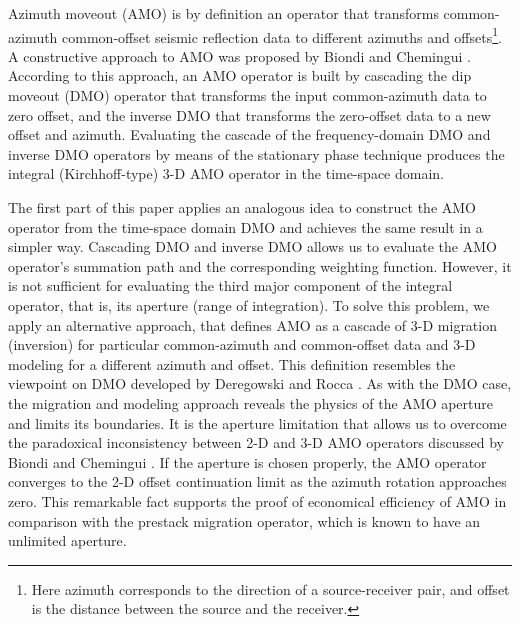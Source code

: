 Azimuth moveout (AMO) is by definition an operator that transforms
common-azimuth common-offset seismic reflection data to different
azimuths and offsets\footnote{Here azimuth corresponds to the
direction of a source-receiver pair, and offset is the distance
between the source and the receiver.}. A constructive approach to 
AMO was proposed by Biondi and Chemingui
.  According to this approach, an AMO
operator is built by cascading the dip moveout (DMO) operator that
transforms the input common-azimuth data to zero offset, and the inverse
DMO that transforms the zero-offset data to a new offset and azimuth.
Evaluating the cascade of the frequency-domain DMO and  inverse DMO
operators by means of the stationary phase technique produces the
integral (Kirchhoff-type) 3-D AMO operator in the time-space domain. 
\par
The first part of this paper applies an analogous idea to construct the AMO
operator from the time-space domain DMO and
achieves the same result in a simpler way.
Cascading DMO and inverse DMO allows us to evaluate the AMO operator's
summation path and the corresponding weighting function. However, it
is not sufficient for evaluating the third major component of the
integral operator, that is, its aperture (range of integration). To solve this
problem, we apply an 
alternative approach, that 
defines AMO as a cascade of 3-D migration (inversion) for 
particular common-azimuth  
and common-offset data and 3-D modeling for a different azimuth and
offset. This   
definition resembles the viewpoint on DMO developed by Deregowski and Rocca 
. As with the DMO case, the
migration and modeling  approach  reveals the physics of the AMO
aperture and limits its boundaries. 
It is the aperture limitation
that allows us to overcome the paradoxical inconsistency between 2-D
and 3-D AMO operators discussed by  Biondi and Chemingui
. 
If the aperture is chosen properly, the AMO operator converges to the 2-D
offset continuation limit as the azimuth rotation approaches zero.  
This remarkable fact supports the proof of economical
efficiency of AMO in comparison with the prestack migration operator,
which is known to have an unlimited aperture. 


